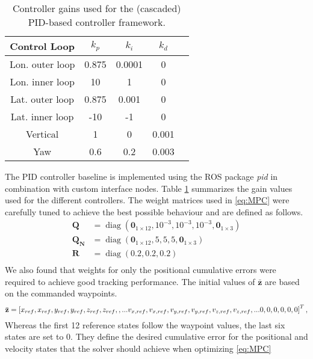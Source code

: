 \setlength{\tabcolsep}{6pt}
\begin{table}[]
\center
\small
\caption{Controller gains used for the (cascaded) PID-based controller framework. \label{tab:gains}}
\begin{tabular}{@{}ccccc@{}}
\toprule
Control Loop            & $k_p$ & $k_i$  & $k_d$ &  \\ \midrule
Lon. outer loop & 0.875 & 0.0001 & 0     &  \\
Lon. inner loop & 10    & 1      & 0     &  \\
Lat. outer loop      & 0.875 & 0.001  & 0     &  \\
Lat. inner loop      & -10    & -1      & 0     &  \\
Vertical             & 1     & 0      & 0.001 &  \\
Yaw                  & 0.6   & 0.2    & 0.003 & \\
\bottomrule
\end{tabular} 
\end{table}

The PID controller baseline is implemented using the ROS package \textit{pid} \cite{ros_pid} in combination with custom interface nodes. Table \ref{tab:gains} summarizes the gain values used for the different controllers.
The weight matrices used in \eqref{eq:MPC} were carefully tuned to achieve the best possible behaviour and are defined as follows.
\begin{align}
\mathbf{Q} &= \operatorname{diag}\left( \mathbf{0}_{1\times12} ,10^{-3},10^{-3},10^{-3},\mathbf{0}_{1\times3}\right)\\
\mathbf{Q_N} &= \operatorname{diag}\left( \mathbf{0}_{1\times12} ,5,5,5,\mathbf{0}_{1\times3}\right)\\
\mathbf{R} &= \operatorname{diag}\left( 0.2,0.2,0.2\right)\\
\end{align}
We also found that weights  for only the positional cumulative errors were required to achieve good tracking performance.
The initial values of $\bar{\mathbf{z}}$ are based on the  commanded waypoints.
\begin{dmath}
\bar{\mathbf{z}}= \left[x_{ref},  x_{ref},  y_{ref},  y_{ref}, z_{ref},  z_{ref},,...\\ v_{x,ref},v_{x,ref}, v_{y,ref}, v_{y,ref},  v_{z,ref},v_{z,ref},...  \\ 0,  0,  0,0, 0, 0\right]^T,
\end{dmath}
Whereas the first 12 reference  states follow the waypoint values, the last six states are set to 0. They define the desired cumulative error for the positional and velocity states that the solver should achieve when optimizing \eqref{eq:MPC} 
